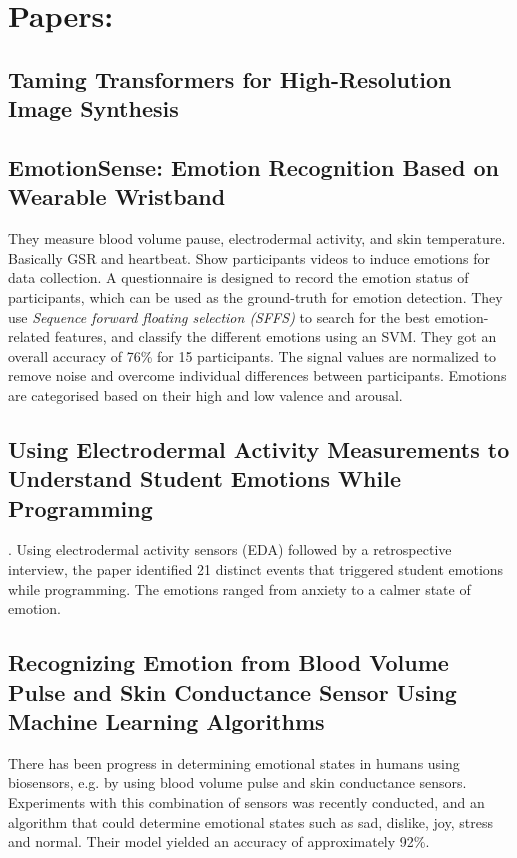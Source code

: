 \section{Papers:}


\subsection{Taming Transformers for High-Resolution Image Synthesis}    

\subsection{EmotionSense: Emotion Recognition Based on Wearable Wristband}
They measure blood volume pause, electrodermal activity, and skin temperature. Basically GSR and heartbeat.
Show participants videos to induce emotions for data collection. 
A questionnaire is designed to record the emotion status of participants, which can be used as the ground-truth for emotion detection.
They use \textit{Sequence forward floating selection (SFFS)} to search for the best emotion-related features, and classify the different emotions using an SVM.
They got an overall accuracy of 76\% for 15 participants.
The signal values are normalized to remove noise and overcome individual differences between participants.
Emotions are categorised based on their high and low valence and arousal. \cite{EmotionSense}

\subsection{Using Electrodermal Activity Measurements to Understand
Student Emotions While Programming} \cite{10.1145/3501385.3543981}.
Using electrodermal activity sensors (EDA) followed by a retrospective interview, the paper identified 21 distinct events that triggered student emotions while programming. The emotions ranged from anxiety to a calmer state of emotion.

\subsection{Recognizing Emotion from Blood Volume Pulse and Skin Conductance Sensor Using Machine Learning Algorithms} There has been progress in determining emotional states in humans using biosensors, e.g. by using blood volume pulse and skin conductance sensors. Experiments with this combination of sensors was recently conducted, and an algorithm that could determine emotional states such as sad, dislike, joy, stress and normal. Their model yielded an accuracy of approximately 92\%.
\cite{RecognizingEmotion}

